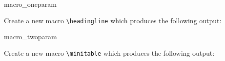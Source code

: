 \begin{dispExample}
\begin{texercise}{macro_oneparam}
\begin{tcboutputlisting}
\newcommand{\headingline}[1]{%
  \begin{center}\Large\bfseries #1\end{center}}
\end{tcboutputlisting}
\tcbuselistingtext%

Create a new macro \verb+\headingline+ which produces the
following output:\par\smallskip
\begin{tcbwritetemp}
\end{tcbwritetemp}
\tcbusetemplisting\tcbusetemp%
\end{texercise}
\end{dispExample}



\begin{dispExample}
\begin{texercise}{macro_twoparam}
\begin{tcboutputlisting}
\newcommand{\minitable}[2]{%
  \begin{center}\begin{tabular}{p{10cm}}\hline%
  \multicolumn{1}{c}{\bfseries#1}\\\hline%
  #2\\\hline%
  \end{tabular}\end{center}}
\end{tcboutputlisting}
\tcbuselistingtext%
Create a new macro \verb+\minitable+ which produces the
following output:\par\smallskip
\begin{tcbwritetemp}
\end{tcbwritetemp}
\tcbusetemplisting\par\smallskip\tcbusetemp%
\end{texercise}
\end{dispExample}



